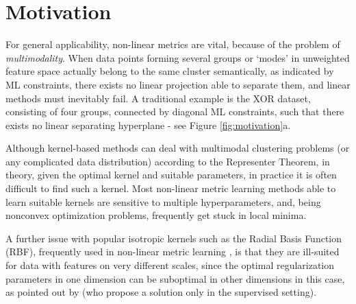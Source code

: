 \documentclass[12pt,PhD,twoside]{muthesis}
\begin{document}
\section*{Motivation}

For general applicability, non-linear metrics are vital, because of the problem of \textit{multimodality}. When data points forming several groups or `modes' in unweighted feature space actually belong to the same cluster semantically, as indicated by ML constraints, there exists no linear projection able to separate them, and linear methods must inevitably fail. A traditional example is the XOR dataset, consisting of four groups, connected by diagonal ML constraints, such that there exists no linear separating hyperplane - see Figure \ref{fig:motivation}a. 

Although kernel-based methods can deal with multimodal clustering problems (or any complicated data distribution) according to the Representer Theorem, in theory, given the optimal kernel and suitable parameters, in practice it is often difficult to find such a kernel. Most non-linear metric learning methods able to learn suitable kernels are sensitive to multiple hyperparameters, and, being nonconvex optimization problems, frequently get stuck in local minima.

A further issue with popular isotropic kernels such as the Radial Basis Function (RBF), frequently used in non-linear metric learning \citep{baghshah2010kernel, chitta2011approximate}, is that they are ill-suited for data with features on very different scales, since the optimal regularization parameters in one dimension can be suboptimal in other dimensions in this case, as pointed out by \citep{ong2005learning} (who propose a solution only in the supervised setting). 
\end{document}

